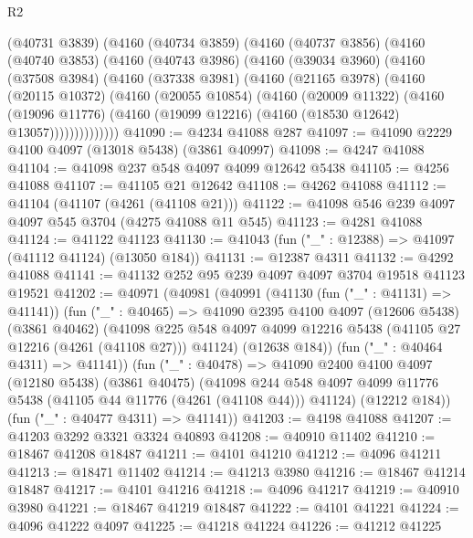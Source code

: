 \begin{lexlean}{R2}
\begin{coremodule}
    (@40731 @3839)
    (@4160
      (@40734 @3859)
      (@4160
        (@40737 @3856)
        (@4160
          (@40740 @3853)
          (@4160
            (@40743 @3986)
            (@4160
              (@39034 @3960)
              (@4160
                (@37508 @3984)
                (@4160
                  (@37338 @3981)
                  (@4160
                    (@21165 @3978)
                    (@4160
                      (@20115 @10372)
                      (@4160
                        (@20055 @10854)
                        (@4160
                          (@20009 @11322)
                          (@4160
                            (@19096 @11776)
                            (@4160 (@19099 @12216) (@4160 (@18530 @12642) @13057))))))))))))))
@41090 := @4234 @41088 @287
@41097 := @41090 @2229 @4100 @4097 (@13018 @5438) (@3861 @40997)
@41098 := @4247 @41088
@41104 := @41098 @237 @548 @4097 @4099 @12642 @5438
@41105 := @4256 @41088
@41107 := @41105 @21 @12642
@41108 := @4262 @41088
@41112 := @41104 (@41107 (@4261 (@41108 @21)))
@41122 := @41098 @546 @239 @4097 @4097 @545 @3704 (@4275 @41088 @11 @545)
@41123 := @4281 @41088
@41124 := @41122 @41123
@41130 := @41043 (fun ("_" : @12388) => @41097 (@41112 @41124) (@13050 @184))
@41131 := @12387 @4311
@41132 := @4292 @41088
@41141 := @41132 @252 @95 @239 @4097 @4097 @3704 @19518 @41123 @19521
@41202 := @40971
    (@40981
      (@40991
        (@41130 (fun ("_" : @41131) => @41141))
        (fun ("_" : @40465) =>
        @41090
          @2395
          @4100
          @4097
          (@12606 @5438)
          (@3861 @40462)
          (@41098
            @225
            @548
            @4097
            @4099
            @12216
            @5438
            (@41105 @27 @12216 (@4261 (@41108 @27)))
            @41124)
          (@12638 @184))
        (fun ("_" : @40464 @4311) => @41141))
      (fun ("_" : @40478) =>
      @41090
        @2400
        @4100
        @4097
        (@12180 @5438)
        (@3861 @40475)
        (@41098 @244 @548 @4097 @4099 @11776 @5438 (@41105 @44 @11776 (@4261 (@41108 @44))) @41124)
        (@12212 @184))
      (fun ("_" : @40477 @4311) => @41141))
@41203 := @4198 @41088
@41207 := @41203 @3292 @3321 @3324 @40893
@41208 := @40910 @11402
@41210 := @18467 @41208 @18487
@41211 := @4101 @41210
@41212 := @4096 @41211
@41213 := @18471 @11402
@41214 := @41213 @3980
@41216 := @18467 @41214 @18487
@41217 := @4101 @41216
@41218 := @4096 @41217
@41219 := @40910 @3980
@41221 := @18467 @41219 @18487
@41222 := @4101 @41221
@41224 := @4096 @41222 @4097
@41225 := @41218 @41224
@41226 := @41212 @41225

\end{coremodule}
\end{lexlean}
